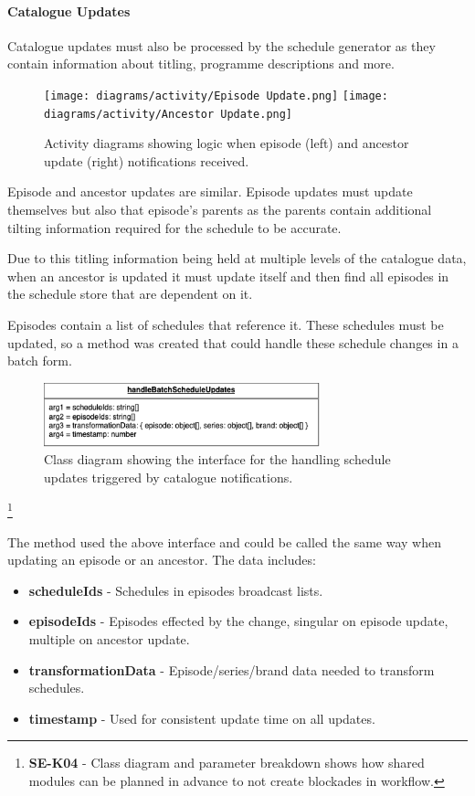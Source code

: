   \newpage
  \paragraph{Catalogue Updates}
  Catalogue updates must also be processed by the schedule generator as they contain information about titling, programme descriptions and more.

  \begin{figure}[H]
    \centering
    \texttt{[image: diagrams/activity/Episode Update.png]}
    \texttt{[image: diagrams/activity/Ancestor Update.png]}
    \caption{Activity diagrams showing logic when episode (left) and ancestor update (right) notifications received.}
    \label{fig:scheduleUpdateCatalogueActivity}
  \end{figure}

  Episode and ancestor updates are similar. Episode updates must update themselves but also that episode's parents as
  the parents contain additional tilting information required for the schedule to be accurate.

  Due to this titling information being held at multiple levels of the catalogue data, when an ancestor is updated it must update itself
  and then find all episodes in the schedule store that are dependent on it.

  Episodes contain a list of schedules that reference it. These schedules must be updated, so a method was created that could handle these
  schedule changes in a batch form.

  \begin{figure}[H]
    \centering
    \includegraphics[width=8cm]{assets/handleBatchScheduleInterface.drawio.png}
    \caption{Class diagram showing the interface for the handling schedule updates triggered by catalogue notifications.}
    \label{fig:catalogueTriggeredScheduleUpdateClass}
  \end{figure}

  \footnote{\textbf{SE-K04} - Class diagram and parameter breakdown shows how shared modules can be planned in advance to not create 
  blockades in workflow.}

  The method used the above interface and could be called the same way when updating an episode or an ancestor. The data includes:
  \begin{itemize}
    \item \textbf{scheduleIds} - Schedules in episodes broadcast lists.
    \item \textbf{episodeIds} - Episodes effected by the change, singular on episode update, multiple on ancestor update.
    \item \textbf{transformationData} - Episode/series/brand data needed to transform schedules.
    \item \textbf{timestamp} - Used for consistent update time on all updates.
  \end{itemize}

